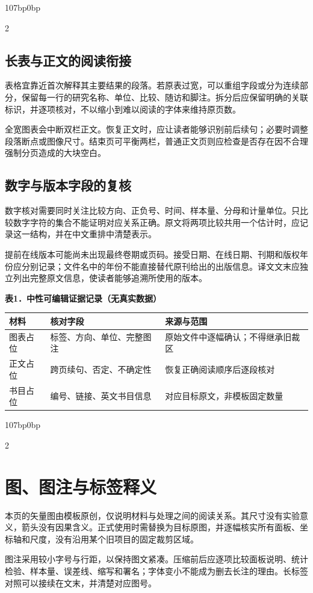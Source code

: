 \documentclass[UTF8,fontset=none,scheme=plain]{ctexart}
\renewcommand{\normalsize}{\fontsize{8.8bp}{11.6bp}\selectfont}
\newenvironment{BMJColumns}{\begin{adjustwidth}{107bp}{0bp}\begin{multicols}{2}\normalsize}{\end{multicols}\end{adjustwidth}}
\begin{document}
\begin{BMJColumns}\SampleOpening
\subsection*{长表与正文的阅读衔接}
表格宜靠近首次解释其主要结果的段落。若原表过宽，可以重组字段或分为连续部分，保留每一行的研究名称、单位、比较、随访和脚注。拆分后应保留明确的关联标识，并逐项核对，不以缩小到难以阅读的字体来维持原页数。\par
全宽图表会中断双栏正文。恢复正文时，应让读者能够识别前后续句；必要时调整段落断点或图像尺寸。结束页可平衡两栏，普通正文页则应检查是否存在因不合理强制分页造成的大块空白。\par
\subsection*{数字与版本字段的复核}
数字核对需要同时关注比较方向、正负号、时间、样本量、分母和计量单位。只比较数字字符的集合不能证明对应关系正确。原文将两项比较共用一个估计时，应记录这一结构，并在中文重排中清楚表示。\par
提前在线版本可能尚未出现最终卷期或页码。接受日期、在线日期、刊期和版权年份应分别记录；文件名中的年份不能直接替代原刊给出的出版信息。译文文末应独立列出完整原文信息，使读者能够追溯所使用的版本。
\end{BMJColumns}
\clearpage
\noindent\begin{minipage}{.57\linewidth}\DemoVector\end{minipage}\hfill\begin{minipage}{.39\linewidth}\sffamily\fontsize{7.6bp}{9.2bp}\selectfont\DemoCaption\end{minipage}\par\vspace{10bp}
{\sffamily\fontsize{8bp}{10.2bp}\selectfont\noindent\textbf{表1．中性可编辑证据记录（无真实数据）}\par\smallskip
\noindent\begin{tabular}{@{}p{110bp}p{170bp}p{220bp}@{}}\toprule
材料 & 核对字段 & 来源与范围\\\midrule
图表占位 & 标签、方向、单位、完整图注 & 原始文件中逐幅确认；不得继承旧裁区\\[4bp]
正文占位 & 跨页续句、否定、不确定性 & 恢复正确阅读顺序后逐段核对\\[4bp]
书目占位 & 编号、链接、英文书目信息 & 对应目标原文，非模板固定数量\\\bottomrule
\end{tabular}\par}
\vspace{8bp}
\begin{BMJColumns}
\section*{图、图注与标签释义}
本页的矢量图由模板原创，仅说明材料与处理之间的阅读关系。其尺寸没有实验意义，箭头没有因果含义。正式使用时需替换为目标原图，并逐幅核实所有面板、坐标轴和尺度，没有沿用某个旧项目的固定裁剪区域。\par
图注采用较小字号与行距，以保持图文紧凑。压缩前后应逐项比较面板说明、统计检验、样本量、误差线、缩写和署名；字体变小不能成为删去长注的理由。长标签对照可以接续在文末，并清楚对应图号。
\SampleClosing\end{BMJColumns}
\end{document}

